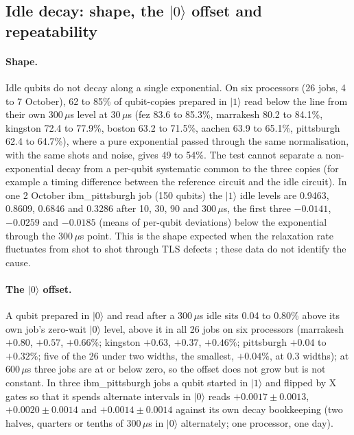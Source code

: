 \documentclass[reprint,amsmath,amssymb,aps,superscriptaddress,nofootinbib]{revtex4-2}
\newcommand{\us}{\,$\mu$s}
\begin{document}
\subsection{Idle decay: shape, the $|0\rangle$ offset and repeatability}\label{sec:decay}

\paragraph*{Shape.} Idle qubits do not decay along a single exponential. On six processors (26 jobs, 4 to 7 October), 62 to 85\% of qubit-copies prepared in $|1\rangle$ read below the line from their own 300\us{} level at 30\us{} (fez 83.6 to 85.3\%, marrakesh 80.2 to 84.1\%, kingston 72.4 to 77.9\%, boston 63.2 to 71.5\%, aachen 63.9 to 65.1\%, pittsburgh 62.4 to 64.7\%), where a pure exponential passed through the same normalisation, with the same shots and noise, gives 49 to 54\%. The test cannot separate a non-exponential decay from a per-qubit systematic common to the three copies (for example a timing difference between the reference circuit and the idle circuit). In one 2 October ibm\_pittsburgh job (150 qubits) the $|1\rangle$ idle levels are 0.9463, 0.8609, 0.6846 and 0.3286 after 10, 30, 90 and 300\us, the first three $-0.0141$, $-0.0259$ and $-0.0185$ (means of per-qubit deviations) below the exponential through the 300\us{} point. This is the shape expected when the relaxation rate fluctuates from shot to shot through TLS defects \cite{Klimov2018,Schlor2019,Burnett2019,Carroll2022,Muller2019}; these data do not identify the cause.

\paragraph*{The $|0\rangle$ offset.} A qubit prepared in $|0\rangle$ and read after a 300\us{} idle sits 0.04 to 0.80\% above its own job's zero-wait $|0\rangle$ level, above it in all 26 jobs on six processors (marrakesh $+0.80$, $+0.57$, $+0.66\%$; kingston $+0.63$, $+0.37$, $+0.46\%$; pittsburgh $+0.04$ to $+0.32\%$; five of the 26 under two widths, the smallest, $+0.04\%$, at 0.3 widths); at 600\us{} three jobs are at or below zero, so the offset does not grow but is not constant. In three ibm\_pittsburgh jobs a qubit started in $|1\rangle$ and flipped by X gates so that it spends alternate intervals in $|0\rangle$ reads $+0.0017\pm0.0013$, $+0.0020\pm0.0014$ and $+0.0014\pm0.0014$ against its own decay bookkeeping (two halves, quarters or tenths of 300\us{} in $|0\rangle$ alternately; one processor, one day).
\end{document}
